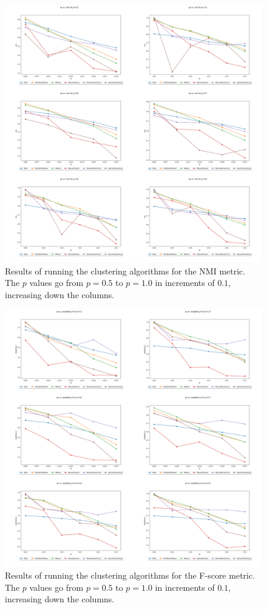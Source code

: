 \documentclass{article}
\begin{document}
\begin{figure}[H]
    \centering
    \includegraphics[width=1.15\textwidth]{results/results_nmi.png}
    \caption[Clustering NMI results]{Results of running the clustering algorithms for the NMI metric. The $p$ values go from $p=0.5$ to $p=1.0$ in increments of $0.1$, increasing down the columns.}
    \label{fig:results_nmi}
\end{figure}

\begin{figure}[H]
    \centering
    \includegraphics[width=1.15\textwidth]{results/results_weighted_ri.png}
    \caption[Clustering weighted RI (F-score) results]{Results of running the clustering algorithms for the F-score metric. The $p$ values go from $p=0.5$ to $p=1.0$ in increments of $0.1$, increasing down the columns.}
    \label{fig:results_weighted_ri}
\end{figure}
\end{document}

